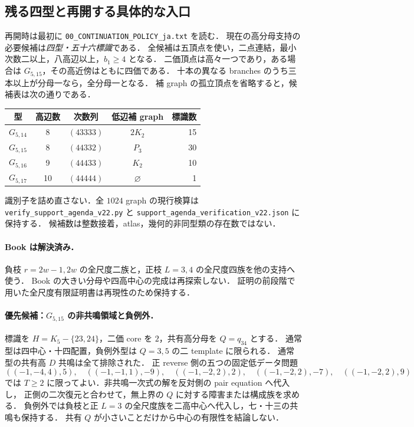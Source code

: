 \subsection{残る四型と再開する具体的な入口}
\label{ns22:support-agenda}\label{ns20:support-agenda}

再開時は最初に \nolinkurl{00_CONTINUATION_POLICY_ja.txt} を読む．
現在の高分母支持の必要候補は\emph{四型・五十六標識}である．
全候補は五頂点を使い，二点連結，最小次数二以上，八高辺以上，$b_1\ge4$ となる．
二価頂点は高々一つであり，ある場合は $G_{5,15}$，その高近傍はともに四価である．
十本の異なる branches のうち三本以上が分母一なら，全分母一となる．
補 graph の孤立頂点を省略すると，候補表は次の通りである．
\begin{center}\small
\begin{tabular}{c|c|c|c|r}
型&高辺数&次数列&低辺補 graph&標識数\\\hline
$G_{5,14}$&8&$(43333)$&$2K_2$&15\\
$G_{5,15}$&8&$(44332)$&$P_3$&30\\
$G_{5,16}$&9&$(44433)$&$K_2$&10\\
$G_{5,17}$&10&$(44444)$&$\varnothing$&1
\end{tabular}
\end{center}
識別子を詰め直さない．全 $1024$ graph の現行検算は
\nolinkurl{verify_support_agenda_v22.py} と
\nolinkurl{support_agenda_verification_v22.json} に保持する．
候補数は整数接着，atlas，幾何的非同型類の存在数ではない．

\paragraph{Book は解決済み．}
負枝 $r=2w-1,2w$ の全尺度二族と，正枝 $L=3,4$ の全尺度四族を他の支持へ使う．
Book の大きい分母や四高中心の完成は再探索しない．
証明の前段階で用いた全尺度有限証明書は再現性のため保持する．

\paragraph{優先候補：$G_{5,15}$ の非共鳴領域と負例外．}
標識を $H=K_5-\{23,24\}$，二価 core を $2$，共有高分母を $Q=q_{34}$ とする．
通常型は四中心・十四配置，負例外型は $Q=3,5$ の二 template に限られる．
通常型の共有高 $D$ 共鳴は全て排除された．
正 reverse 側の五つの固定低データ問題
\[
((-1,-4,4),5),\quad((-1,-1,1),-9),\quad
((-1,-2,2),2),\quad((-1,-2,2),-7),\quad((-1,-2,2),9)
\]
では $T\ge2$ に限ってよい．非共鳴一次式の解を反対側の pair equation へ代入し，
正側の二次復元と合わせて，無上界の $Q$ に対する障害または構成族を求める．
負例外では負枝と正 $L=3$ の全尺度族を二高中心へ代入し，七・十三の共鳴も保持する．
共有 $Q$ が小さいことだけから中心の有限性を結論しない．

